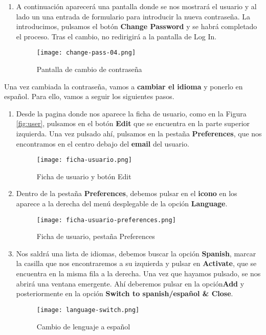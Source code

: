 \begin{enumerate}
    \item A continuación aparecerá una pantalla donde se nos mostrará el usuario y al lado un una entrada de formulario para introducir la nueva contraseña. La introducimos, pulsamos el botón \textbf{Change Password} y se habrá completado el proceso. Tras el cambio, no redirigirá a la pantalla de Log In.

    \begin{figure}[ht]
        \centering
        \texttt{[image: change-pass-04.png]}
        \caption{Pantalla de cambio de contraseña}
    \end{figure}
\end{enumerate}

Una vez cambiada la contraseña, vamos a \textbf{cambiar el idioma} y ponerlo en español. Para ello, vamos a seguir los siguientes pasos.

\begin{enumerate}
    \item Desde la pagina donde nos aparece la ficha de usuario, como en la Figura \ref{fig:user}, pulsamos en el botón \textbf{Edit} que se encuentra en la parte superior izquierda. Una vez pulsado ahí, pulsamos en la pestaña \textbf{Preferences}, que nos encontramos en el centro debajo del \textbf{email} del usuario.

    \vspace{10ex}

   \begin{figure}[ht]
       \centering
       \texttt{[image: ficha-usuario.png]}
       \caption{Ficha de usuario y botón Edit}
   \end{figure}

   \item Dentro de la pestaña \textbf{Preferences}, debemos pulsar en el \textbf{icono} en los aparece a la derecha del menú desplegable de la opción \textbf{Language}.

   \begin{figure}[ht]
       \centering
       \texttt{[image: ficha-usuario-preferences.png]}
       \caption{Ficha de usuario, pestaña Preferences}
   \end{figure}

   \item Nos saldrá una lista de idiomas, debemos buscar la opción \textbf{Spanish}, marcar la casilla que nos encontraremos a su izquierda y pulsar en \textbf{Activate}, que se encuentra en la misma fila a la derecha. Una vez que hayamos pulsado, se nos abrirá una ventana emergente. Ahí deberemos pulsar en la opción\textbf{Add} y posteriormente en la opción \textbf{Switch to spanish/español \& Close}.

    \vspace{15ex}
   \begin{figure}[ht]
       \centering
       \texttt{[image: language-switch.png]}
       \caption{Cambio de lenguaje a español}
       \label{fig:lang}
   \end{figure}
\end{enumerate}

